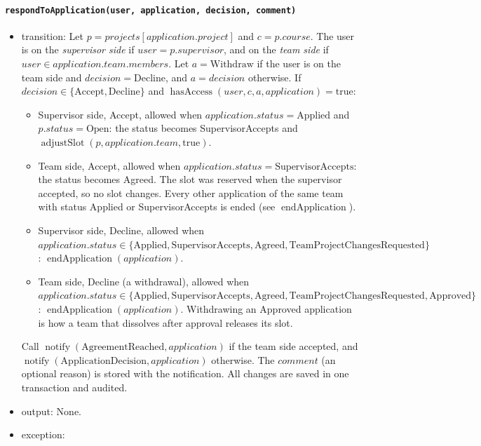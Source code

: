\documentclass[12pt, titlepage]{article}
\begin{document}
\paragraph{\texttt{respondToApplication(user, application, decision, comment)}}
\begin{itemize}
    \item transition: Let $p=\mathit{projects}[application.project]$ and $c=p.course$. The user is on the \emph{supervisor side} if $user=p.supervisor$, and on the \emph{team side} if $user\in application.team.members$. Let $a=\text{Withdraw}$ if the user is on the team side and $decision=\text{Decline}$, and $a=decision$ otherwise. If $decision\in\{\text{Accept},\text{Decline}\}$ and $\operatorname{hasAccess}(user,c,a,application)=\text{true}$:
    \begin{itemize}
        \item Supervisor side, Accept, allowed when $application.status=\text{Applied}$ and $p.status=\text{Open}$: the status becomes SupervisorAccepts and $\operatorname{adjustSlot}(p,application.team,\text{true})$.
        \item Team side, Accept, allowed when $application.status=\text{SupervisorAccepts}$: the status becomes Agreed. The slot was reserved when the supervisor accepted, so no slot changes. Every other application of the same team with status Applied or SupervisorAccepts is ended (see $\operatorname{endApplication}$).
        \item Supervisor side, Decline, allowed when $application.status\in\{\text{Applied},\text{SupervisorAccepts},\text{Agreed},\text{TeamProjectChangesRequested}\}$: $\operatorname{endApplication}(application)$.
        \item Team side, Decline (a withdrawal), allowed when $application.status\in\{\text{Applied},\text{SupervisorAccepts},\text{Agreed},\text{TeamProjectChangesRequested},\text{Approved}\}$: $\operatorname{endApplication}(application)$. Withdrawing an Approved application is how a team that dissolves after approval releases its slot.
    \end{itemize}
    Call $\operatorname{notify}(\text{AgreementReached},application)$ if the team side accepted, and $\operatorname{notify}(\text{ApplicationDecision},application)$ otherwise. The $comment$ (an optional reason) is stored with the notification. All changes are saved in one transaction and audited.
    \item output: None.
    \item exception:
    \begin{itemize}

\end{itemize}
\end{itemize}
\end{document}
